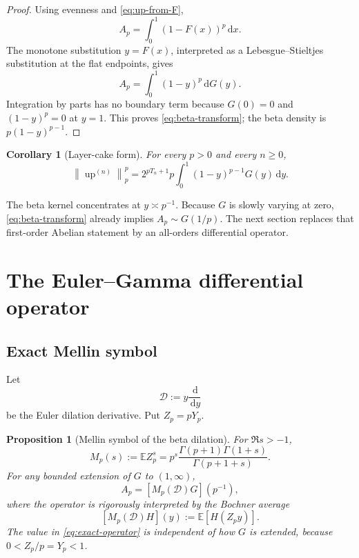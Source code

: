 \documentclass[11pt,oneside]{article}
\numberwithin{equation}{section}
\theoremstyle{plain}
\newtheorem{proposition}[theorem]{Proposition}
\newtheorem{corollary}[theorem]{Corollary}
\theoremstyle{definition}
\theoremstyle{remark}
\newcommand{\Up}{\operatorname{up}}
\newcommand{\dd}{\,\mathrm d}
\newcommand{\E}{\mathbb E}
\newcommand{\Dop}{\mathscr D}
\newcommand{\norm}[1]{\left\lVert#1\right\rVert}
\begin{document}
\begin{proof}
Using evenness and \eqref{eq:up-from-F},
\[
 A_p=\int_0^1(1-F(x))^p\dd x.
\]
The monotone substitution $y=F(x)$, interpreted as a Lebesgue--Stieltjes substitution at the
flat endpoints, gives
\[
 A_p=\int_0^1(1-y)^p\dd G(y).
\]
Integration by parts has no boundary term because $G(0)=0$ and $(1-y)^p=0$ at $y=1$.
This proves \eqref{eq:beta-transform}; the beta density is
$p(1-y)^{p-1}$.
\end{proof}

\begin{corollary}[Layer-cake form]
For every $p>0$ and every $n\geq0$,
\begin{equation}
 \norm{\Up^{(n)}}_p^p
 =2^{pT_n+1}p\int_0^1(1-y)^{p-1}G(y)\dd y.
 \label{eq:derivative-beta-transform}
\end{equation}
\end{corollary}

The beta kernel concentrates at $y\asymp p^{-1}$.  Because $G$ is slowly varying at zero,
\eqref{eq:beta-transform} already implies $A_p\sim G(1/p)$.  The next section replaces that
first-order Abelian statement by an all-orders differential operator.

\section{The Euler--Gamma differential operator}
\label{sec:gamma-operator}

\subsection{Exact Mellin symbol}

Let
\begin{equation}
 \Dop:=y\frac{\dd}{\dd y}
 \label{eq:Euler-operator}
\end{equation}
be the Euler dilation derivative.  Put $Z_p=pY_p$.

\begin{proposition}[Mellin symbol of the beta dilation]
\label{prop:Mellin-symbol}
For $\Re s>-1$,
\begin{equation}
 \boxed{
 M_p(s):=\E Z_p^s
 =p^s\frac{\Gamma(p+1)\Gamma(1+s)}{\Gamma(p+1+s)}.}
 \label{eq:Mellin-symbol}
\end{equation}
For any bounded extension of $G$ to $(1,\infty)$,
\begin{equation}
 \boxed{
 A_p=\left[M_p(\Dop)G\right](p^{-1}),}
 \label{eq:exact-operator}
\end{equation}
where the operator is rigorously interpreted by the Bochner average
\begin{equation}
 \left[M_p(\Dop)H\right](y)
 :=\E\left[H(Z_py)\right].
 \label{eq:Bochner-dilation}
\end{equation}
The value in \eqref{eq:exact-operator} is independent of how $G$ is extended, because
$0<Z_p/p=Y_p<1$.
\end{proposition}
\end{document}
